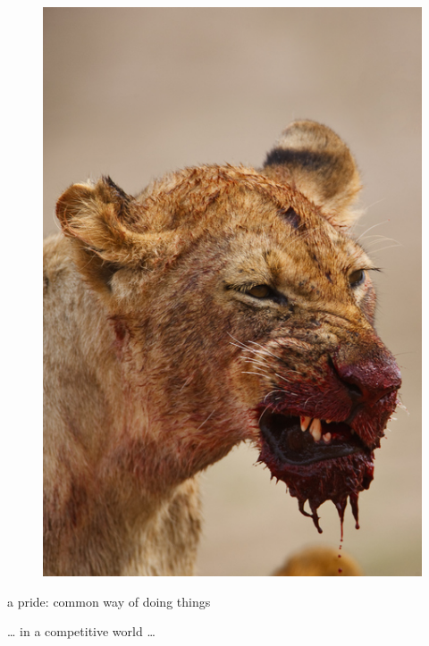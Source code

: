 \documentclass[ignorenonframetext,]{beamer}
\begin{document}
\begin{frame}{}

\begin{figure}[htbp]
\centering
\includegraphics{./figures/lion.png}
\caption{}
\end{figure}

a pride: common way of doing things

\ldots{} in a competitive world \ldots{}

\end{frame}
\end{document}
